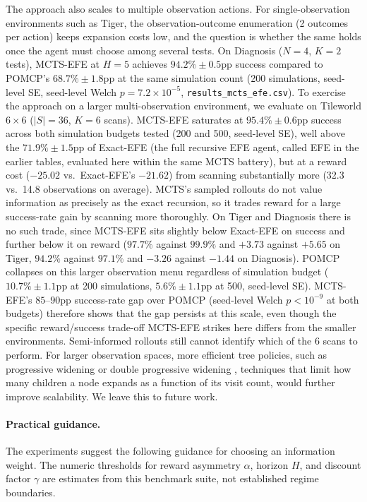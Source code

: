 The approach also scales to multiple observation actions. For single-observation environments such as Tiger, the observation-outcome enumeration (2 outcomes per action) keeps expansion costs low, and the question is whether the same holds once the agent must choose among several tests. On Diagnosis ($N{=}4$, $K{=}2$ tests), MCTS-EFE at $H{=}5$ achieves $94.2\% \pm 0.5$pp success compared to POMCP's $68.7\% \pm 1.8$pp at the same simulation count (200 simulations, seed-level SE, seed-level Welch $p{=}7.2{\times}10^{-5}$, \texttt{results\_\allowbreak mcts\_\allowbreak efe.csv}). To exercise the approach on a larger multi-observation environment, we evaluate on Tileworld $6{\times}6$ ($|S|{=}36$, $K{=}6$ scans). MCTS-EFE saturates at $95.4\% \pm 0.6$pp success across both simulation budgets tested (200 and 500, seed-level SE), well above the $71.9\% \pm 1.5$pp of Exact-EFE (the full recursive EFE agent, called EFE in the earlier tables, evaluated here within the same MCTS battery), but at a reward cost ($-25.02$ vs.\ Exact-EFE's $-21.62$) from scanning substantially more (32.3 vs.\ 14.8 observations on average). MCTS's sampled rollouts do not value information as precisely as the exact recursion, so it trades reward for a large success-rate gain by scanning more thoroughly. On Tiger and Diagnosis there is no such trade, since MCTS-EFE sits slightly below Exact-EFE on success and further below it on reward ($97.7\%$ against $99.9\%$ and $+3.73$ against $+5.65$ on Tiger, $94.2\%$ against $97.1\%$ and $-3.26$ against $-1.44$ on Diagnosis). POMCP collapses on this larger observation menu regardless of simulation budget ($10.7\% \pm 1.1$pp at 200 simulations, $5.6\% \pm 1.1$pp at 500, seed-level SE). MCTS-EFE's $85$--$90$pp success-rate gap over POMCP (seed-level Welch $p<10^{-9}$ at both budgets) therefore shows that the gap persists at this scale, even though the specific reward/success trade-off MCTS-EFE strikes here differs from the smaller environments. Semi-informed rollouts still cannot identify which of the 6 scans to perform. For larger observation spaces, more efficient tree policies, such as progressive widening or double progressive widening \citep{benchetrit2025}, techniques that limit how many children a node expands as a function of its visit count, would further improve scalability. We leave this to future work.

\paragraph{Practical guidance.}
The experiments suggest the following guidance for choosing an information weight. The numeric thresholds for reward asymmetry $\alpha$, horizon $H$, and discount factor $\gamma$ are estimates from this benchmark suite, not established regime boundaries.

